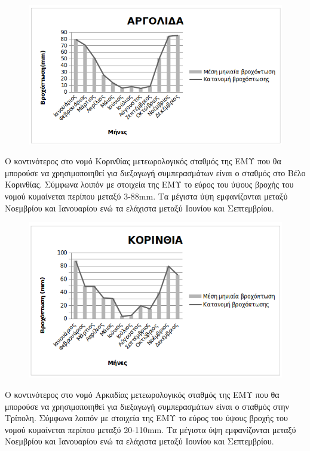 \documentclass[12pt]{article}
\newcommand{\gr}{\selectlanguage{greek}}
\newcommand{\eng}{\selectlanguage{english}}
\begin{document}
	\begin{figure} [H]
		\begin{center}
			\includegraphics [scale = 0.80] {rain1.png}
		\end{center}
	\end{figure}

	Ο κοντινότερος στο νομό Κορινθίας μετεωρολογικός σταθμός της ΕΜΥ που θα μπορούσε να χρησιμοποιηθεί για διεξαγωγή συμπερασμάτων είναι ο σταθμός στο Βέλο Κορινθίας. Σύμφωνα λοιπόν με στοιχεία της ΕΜΥ το εύρος του ύψους βροχής του νομού κυμαίνεται περίπου μεταξύ 3-88\eng mm. \gr Τα μέγιστα ύψη εμφανίζονται μεταξύ Νοεμβρίου και Ιανουαρίου ενώ τα ελάχιστα μεταξύ Ιουνίου και Σεπτεμβρίου.
	
	\begin{figure} [H]
		\begin{center}
			\includegraphics [scale = 0.80] {rain2.png}
		\end{center}
	\end{figure}

	Ο κοντινότερος στο νομό Αρκαδίας μετεωρολογικός σταθμός της ΕΜΥ που θα μπορούσε να χρησιμοποιηθεί για διεξαγωγή συμπερασμάτων είναι ο σταθμός στην Τρίπολη. Σύμφωνα λοιπόν με στοιχεία της ΕΜΥ το εύρος του ύψους βροχής του νομού κυμαίνεται περίπου μεταξύ 20-110mm. Τα μέγιστα ύψη εμφανίζονται μεταξύ Νοεμβρίου και Ιανουαρίου ενώ τα ελάχιστα μεταξύ Ιουνίου και Σεπτεμβρίου.
	
\end{document}
